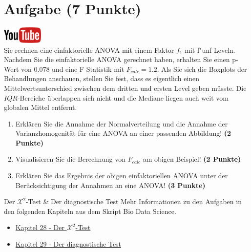 \documentclass[a4paper, 10pt]{scrartcl}\usepackage[]{graphicx}\usepackage[]{xcolor}
\begin{document}
 
\clearpage

\section{Aufgabe \hfill (7 Punkte)}

\hfill\href{https://youtu.be/M9Uhm67ndxM}{\includegraphics[width =
  2cm]{img/youtube}}\\[1Ex]




Sie rechnen eine einfaktorielle ANOVA mit einem Faktor $f_1$ mit
f{"u}nf Leveln. Nachdem Sie die einfaktorielle ANOVA gerechnet
haben, erhalten Sie einen p-Wert von $0.078$ und eine F Statistik mit
$F_{calc} = 1.2$. Als Sie sich die Boxplots der Behandlungen anschauen,
stellen Sie fest, dass es eigentlich einen Mittelwertsunterschied zwischen
dem dritten und ersten Level geben m{\"u}sste. Die
$IQR$-Bereiche {\"u}berlappen sich nicht und die Mediane liegen auch weit vom
globalen Mittel entfernt.


\begin{enumerate}
\item Erkl{\"a}ren Sie die Annahme der Normalverteilung und die Annahme der
  Varianzhomogenit{\"a}t f{\"u}r eine ANOVA an einer passenden Abbildung! \textbf{(2 Punkte)}
\item Visualisieren Sie die Berechnung von $F_{calc}$ am obigen Beispiel!
  \textbf{(2 Punkte)}
\item Erkl{\"a}ren Sie das Ergebnis der obigen einfaktoriellen ANOVA unter der
  Ber{\"u}cksichtigung der Annahmen an eine ANOVA! \textbf{(3 Punkte)}
\end{enumerate}

 
\clearpage
  \begin{graybox}{Der $\mathcal{X}^2$-Test \& Der diagnostische Test}
Mehr Informationen zu den Aufgaben in den folgenden Kapiteln aus dem Skript Bio Data Science.
  \begin{itemize}
  \item \href{https://jkruppa.github.io/stat-tests-chi-test.html}{Kapitel 28 - Der $\mathcal{X}^2$-Test}
  \item \href{https://jkruppa.github.io/stat-tests-diagnostic.html}{Kapitel 29 - Der diagnostische Test}
  \end{itemize}
\end{graybox}
\clearpage
\end{document}
